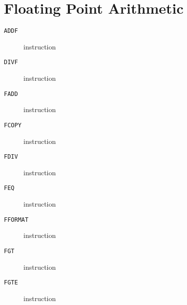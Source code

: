 \section{Floating Point Arithmetic}
\begin{description}
\item[\texttt{ADDF}] instruction\\

\end{description}
\clearpage
\begin{description}
\item[\texttt{DIVF}] instruction\\

\end{description}
\clearpage
\begin{description}
\item[\texttt{FADD}] instruction\\

\end{description}
\clearpage
\begin{description}
\item[\texttt{FCOPY}] instruction\\

\end{description}
\clearpage
\begin{description}
\item[\texttt{FDIV}] instruction\\

\end{description}
\clearpage
\begin{description}
\item[\texttt{FEQ}] instruction\\

\end{description}
\clearpage
\begin{description}
\item[\texttt{FFORMAT}] instruction\\

\end{description}
\clearpage
\begin{description}
\item[\texttt{FGT}] instruction\\

\end{description}
\clearpage
\begin{description}
\item[\texttt{FGTE}] instruction\\

\end{description}
